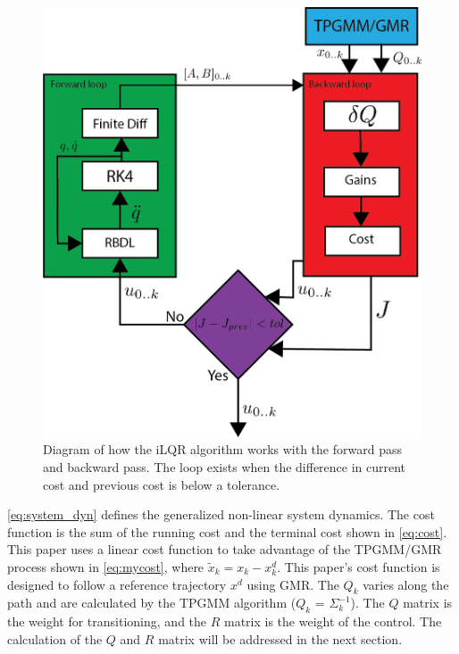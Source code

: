 \begin{figure}[h]
    \centering
    \includegraphics{images/controllers/ilqr2.png}
    \caption[iLQR Learning Loop Diagram]{Diagram of how the iLQR algorithm works with the forward pass and backward pass. The loop exists when the difference in current cost and previous cost is below a tolerance. }
    \label{fig:ilqrDiagram}
\end{figure}



\autoref{eq:system_dyn} defines the  generalized non-linear system dynamics. The cost function is the sum of the running cost and the terminal cost shown in \autoref{eq:cost}. This paper uses a linear cost function to take advantage of the TPGMM/GMR process shown in \autoref{eq:mycost}, where $\tilde{x}_k = x_k - x^{d}_k$. This paper's cost function is designed to follow a reference trajectory $x^{d}$ using GMR. The $Q_k$ varies along the path and  are calculated by the TPGMM algorithm ($Q_k$ =  $\Sigma_k^{-1}$). The  $Q$ matrix is the weight for transitioning, and the $R$ matrix is the weight of the control. The calculation of the $Q$ and $R$ matrix will be addressed in the next section.


